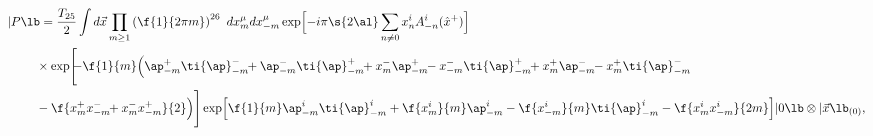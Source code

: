 \begin{equation}
\begin{split}
|P\lb &
= \frac{T_{25}}{2}\int d\vec{x} 
\prod_{m\geq 1}\left(\f{1}{2\pi m}\right)^{26}\ dx^\mu_{m}dx^\mu_{-m}
\exp\Bigl[-i\pi\s{2\al}\sum_{n\neq 0}x^{i}_n
A^{i}_{-n}(\hat{x}^+)\Bigr]\\
&\!\!\times \exp\Biggl[\!\!-\f{1}{m}\Bigl(\ap^+_{-m}\ti{\ap}^-_{-m}
\!\!+\ap^-_{-m}\ti{\ap}^+_{-m}\!\!+x^-_m\ap^+_{-m}\!\!-
x^-_{-m}\ti{\ap}^+_{-m}
\!\!+x^+_m\ap^-_{-m}\!\!-x^+_{m}\ti{\ap}^-_{-m} \\ &
\!\!-\f{x^+_{m}x^-_{-m}\!\!+x^-_{m}x^+_{-m}}{2}\Bigr)
\Biggr] \exp\Bigl[\f{1}{m}\ap^i_{-m}\ti{\ap}^i_{-m}
+\f{x^i_m}{m}\ap^i_{-m}-\f{x^i_{-m}}{m}\ti{\ap}^i_{-m}
-\f{x^i_m x^i_{-m}}{2m}\Bigr]| 0\lb
\otimes |\vec{x}\lb_{(0)}, \label{bsp}
\end{split}
\end{equation}


